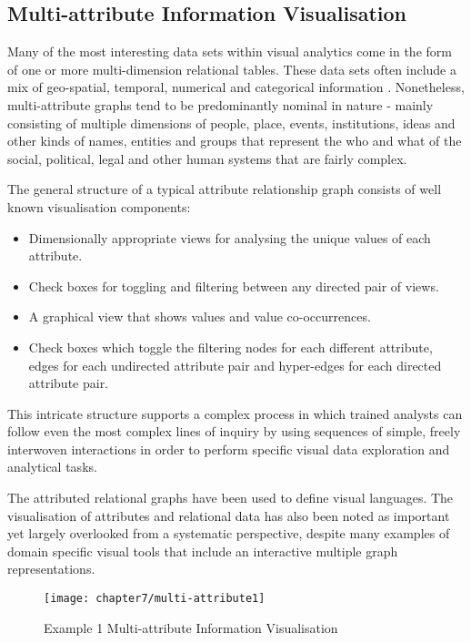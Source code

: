 \subsection{Multi-attribute Information Visualisation}

Many of the most interesting data sets within visual analytics come in the form of one or more multi-dimension relational tables. These data sets often include a mix of geo-spatial, temporal, numerical and categorical information \cite{grundy2009visualisation}. Nonetheless, multi-attribute graphs tend to be predominantly nominal in nature - mainly consisting of multiple dimensions of people, place, events, institutions, ideas and other kinds of names, entities and groups that represent the who and what of the social, political, legal and other human systems that are fairly complex.

The general structure of a typical attribute relationship graph consists of  well known visualisation components: 
\begin{itemize}
\item 	Dimensionally appropriate views for analysing the unique values of each attribute.
\item	Check boxes for toggling and filtering between any directed pair of views.
\item	A graphical view that shows values and value co-occurrences.
\item	Check boxes which toggle the filtering nodes for each different attribute, edges for each undirected attribute pair and hyper-edges for each directed attribute pair.
\end{itemize}

This intricate structure supports a complex process in which trained analysts can follow even the most complex lines of inquiry by using sequences of simple, freely interwoven interactions in order to perform specific visual data exploration and analytical tasks.

The attributed relational graphs have been used to define visual languages. The visualisation of attributes and relational data has also been noted as important yet largely overlooked from a systematic perspective, despite many examples of domain specific visual tools that include an interactive multiple graph representations.

\begin{figure}[H]
\centering
\texttt{[image: chapter7/multi-attribute1]}
\caption{ Example 1 Multi-attribute Information Visualisation}
\end{figure}

